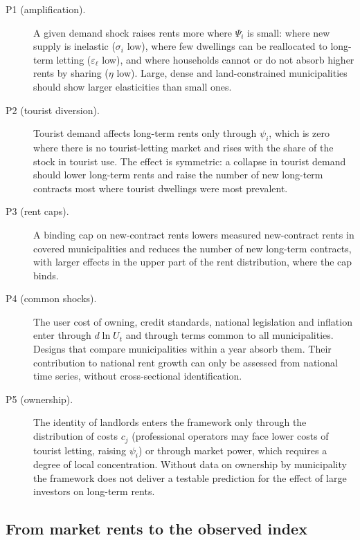\begin{description}
\item[P1 (amplification).] A given demand shock raises rents more where $\Psi_i$ is small: where new supply is inelastic ($\sigma_i$ low), where few dwellings can be reallocated to long-term letting ($\varepsilon_\ell$ low), and where households cannot or do not absorb higher rents by sharing ($\eta$ low). Large, dense and land-constrained municipalities should show larger elasticities than small ones.
\item[P2 (tourist diversion).] Tourist demand affects long-term rents only through $\psi_i$, which is zero where there is no tourist-letting market and rises with the share of the stock in tourist use. The effect is symmetric: a collapse in tourist demand should lower long-term rents and raise the number of new long-term contracts most where tourist dwellings were most prevalent.
\item[P3 (rent caps).] A binding cap on new-contract rents lowers measured new-contract rents in covered municipalities and reduces the number of new long-term contracts, with larger effects in the upper part of the rent distribution, where the cap binds.
\item[P4 (common shocks).] The user cost of owning, credit standards, national legislation and inflation enter through $d\ln U_t$ and through terms common to all municipalities. Designs that compare municipalities within a year absorb them. Their contribution to national rent growth can only be assessed from national time series, without cross-sectional identification.
\item[P5 (ownership).] The identity of landlords enters the framework only through the distribution of costs $c_j$ (professional operators may face lower costs of tourist letting, raising $\psi_i$) or through market power, which requires a degree of local concentration. Without data on ownership by municipality the framework does not deliver a testable prediction for the effect of large investors on long-term rents.
\end{description}

\subsection{From market rents to the observed index}

